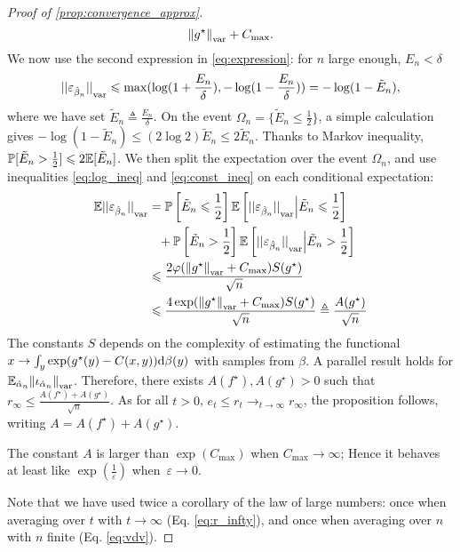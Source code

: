 \begin{proof}[Proof of \autoref{prop:convergence_approx}]
\begin{equation}
    {\Vert g^\star \Vert}_{\text{\upshape var}} + C_{\max}.
\end{equation}
 We now use the second expression in \eqref{eq:expression}: for $n$ large enough, $E_n < \delta$
\begin{equation}\label{eq:log_ineq}
    {|| \varepsilon_{\hat \beta_n} ||}_{\text{\upshape var}} \leqslant \max ( \log(1 + \frac{E_n}{\delta}),
     - \log(1 - \frac{E_n}{\delta}) ) = 
    - \log(1 - \tilde E_n),
\end{equation}
where we have set $\tilde E_n \triangleq \frac{E_n}{\delta}$. On the event
$\Omega_n = \{\tilde E_n \leq \frac{1}{2}\}$, a simple calculation gives $- \log(1
- \tilde E_n) \leq (2 \log 2) \tilde E_n \leq 2 \tilde E_n$. Thanks to Markov inequality,
$\mathbb{P}[\tilde E_n > \frac{1}{2}] \leqslant 2 \mathbb{E}[\tilde E_n]$. We then split the
expectation over the event $\Omega_n$, and use inequalities \eqref{eq:log_ineq}
and \eqref{eq:const_ineq} on each conditional expectation:
\begin{align}\label{eq:vdv}
    \mathbb{E} {|| \varepsilon_{\hat \beta_n} ||}_{\text{\upshape var}}  &= \mathbb{P}\left[\tilde E_n \leqslant \frac{1}{2}\right] 
    \mathbb{E} \left[ {|| \varepsilon_{\hat \beta_n} ||}_{\text{\upshape var}}
    \Big| \tilde E_n \leqslant \frac{1}{2}\right] 
    \\
    &\phantom{=}
    + \mathbb{P}\left[\tilde E_n > \frac{1}{2}\right]      \mathbb{E} \left[ {|| \varepsilon_{\hat \beta_n} ||}_{\text{\upshape var}}
    \Big| \tilde E_n > \frac{1}{2}\right] \\
    &\leqslant \frac{2 \varphi({\Vert g^\star \Vert}_{\text{\upshape var}} + C_{\max}) 
    S(g^\star)}{\sqrt{n}}\\
    &\leqslant \frac{4 \exp({\Vert g^\star \Vert}_{\text{\upshape var}} + C_{\max}) 
    S(g^\star)}{\sqrt{n}} \triangleq \frac{A(g^\star)}{\sqrt{n}}
\end{align}
The constants $S$ depends on the complexity of estimating
the functional $x \to \int_y \exp(g^\star(y) - C(x,y)) \textrm{d} \beta(y)$ with samples from $\beta$.
A parallel
result holds for $\mathbb{E}_{\hat \alpha_n} {\Vert \iota_{\hat \alpha_n}
\Vert}_{\text{\upshape var}}$. Therefore, there exists $A(f^\star), A(g^\star) > 0$ such that $r_\infty \leq
\frac{A(f^\star) + A(g^\star)}{\sqrt{n}}$. As for all $t >0$, $e_t \leq r_t \to_{t \to \infty}
r_\infty$, the proposition follows,  writing $A = A(f^\star) + A(g^\star)$.

The constant $A$ is larger than $\exp(C_{\max})$ when $C_{\max} \to
\infty$; Hence it behaves at least like $\exp(\frac{1}{\varepsilon})$ when~$\varepsilon
\to 0$.

Note that we have used twice a corollary of the law of large numbers: once when
averaging over $t$ with $t \to \infty$ (Eq. \eqref{eq:r_infty}), and once when
averaging over $n$ with $n$ finite (Eq. \eqref{eq:vdv}).
\end{proof}


